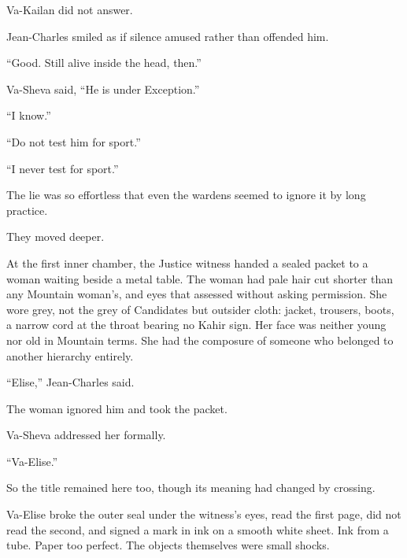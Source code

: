 Va-Kailan did not answer.\par

Jean-Charles smiled as if silence amused rather than offended him.\par

“Good. Still alive inside the head, then.”\par

Va-Sheva said, “He is under Exception.”\par

“I know.”\par

“Do not test him for sport.”\par

“I never test for sport.”\par

The lie was so effortless that even the wardens seemed to ignore it by long practice.\par

They moved deeper.\par

At the first inner chamber, the Justice witness handed a sealed packet to a woman waiting beside a metal table. The woman had pale hair cut shorter than any Mountain woman’s, and eyes that assessed without asking permission. She wore grey, not the grey of Candidates but outsider cloth: jacket, trousers, boots, a narrow cord at the throat bearing no Kahir sign. Her face was neither young nor old in Mountain terms. She had the composure of someone who belonged to another hierarchy entirely.\par

“Elise,” Jean-Charles said.\par

The woman ignored him and took the packet.\par

Va-Sheva addressed her formally.\par

“Va-Elise.”\par

So the title remained here too, though its meaning had changed by crossing.\par

Va-Elise broke the outer seal under the witness’s eyes, read the first page, did not read the second, and signed a mark in ink on a smooth white sheet. Ink from a tube. Paper too perfect. The objects themselves were small shocks.\par

